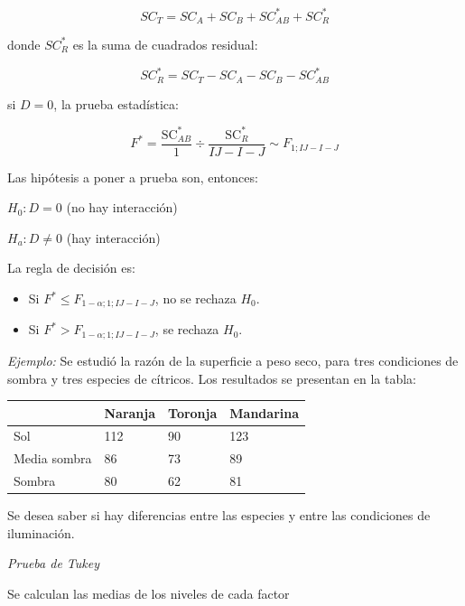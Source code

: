 \documentclass[]{book}
\theoremstyle{definition}
\theoremstyle{definition}
\theoremstyle{definition}
\theoremstyle{remark}
\begin{document}
\[
SC_{T} = SC_{A} + SC_{B} + SC_{AB}^{*} + SC_{R}^{*}
\]

donde \(SC_{R}^{*}\) es la suma de cuadrados residual:

\[
SC_{R}^{*} = SC_{T} - SC_{A} - SC_{B} - SC_{AB}^{*}
\]

si \(D = 0\), la prueba estadística:

\[
F^{*} = \frac{\text{SC}_{AB}^{*}}{1} \div \frac{\text{SC}_{R}^{*}}{IJ - I - J}\sim F_{1;IJ - I - J}
\]

Las hipótesis a poner a prueba son, entonces:

\(H_{0}:D = 0\) (no hay interacción)

\(H_{a}:D \neq 0\) (hay interacción)

La regla de decisión es:

\begin{itemize}
\item
  Si \(F^{*} \leq F_{1 - \alpha;1;IJ - I - J}\), no se rechaza
  \(H_{0}\).
\item
  Si \(F^{*} > F_{1 - \alpha;1;IJ - I - J}\), se rechaza \(H_{0}\).
\end{itemize}

\emph{Ejemplo:} Se estudió la razón de la superficie a peso seco, para
tres condiciones de sombra y tres especies de cítricos. Los resultados
se presentan en la tabla:

\begin{longtable}[]{@{}llll@{}}
\toprule
& Naranja & Toronja & Mandarina\tabularnewline
\midrule
\endhead
Sol & 112 & 90 & 123\tabularnewline
Media sombra & 86 & 73 & 89\tabularnewline
Sombra & 80 & 62 & 81\tabularnewline
\bottomrule
\end{longtable}

Se desea saber si hay diferencias entre las especies y entre las
condiciones de iluminación.

\emph{Prueba de Tukey}

Se calculan las medias de los niveles de cada factor
\end{document}
